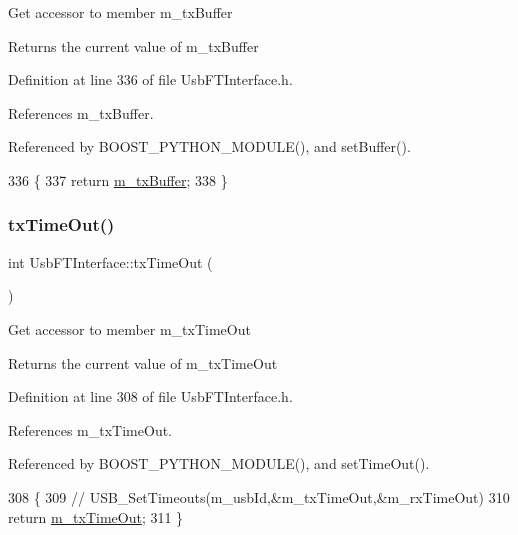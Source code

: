 Get accessor to member m\+\_\+tx\+Buffer \begin{DoxyReturn}{Returns}
the current value of m\+\_\+tx\+Buffer 
\end{DoxyReturn}


Definition at line 336 of file Usb\+F\+T\+Interface.\+h.



References m\+\_\+tx\+Buffer.



Referenced by B\+O\+O\+S\+T\+\_\+\+P\+Y\+T\+H\+O\+N\+\_\+\+M\+O\+D\+U\+L\+E(), and set\+Buffer().


\begin{DoxyCode}
336                   \{
337     \textcolor{keywordflow}{return} \hyperlink{classUsbFTInterface_a10385649160531f6976d55176bee1f2d}{m\_txBuffer};
338   \}
\end{DoxyCode}
\mbox{\label{classUsbFTInterface_acab2397cb42003a1ed8f69a0c6cae195}} 
\subsubsection{\texorpdfstring{tx\+Time\+Out()}{txTimeOut()}}
{\footnotesize\ttfamily int Usb\+F\+T\+Interface\+::tx\+Time\+Out (\begin{DoxyParamCaption}{ }\end{DoxyParamCaption})\hspace{0.3cm}{\ttfamily [inline]}}

Get accessor to member m\+\_\+tx\+Time\+Out \begin{DoxyReturn}{Returns}
the current value of m\+\_\+tx\+Time\+Out 
\end{DoxyReturn}


Definition at line 308 of file Usb\+F\+T\+Interface.\+h.



References m\+\_\+tx\+Time\+Out.



Referenced by B\+O\+O\+S\+T\+\_\+\+P\+Y\+T\+H\+O\+N\+\_\+\+M\+O\+D\+U\+L\+E(), and set\+Time\+Out().


\begin{DoxyCode}
308                    \{
309     \textcolor{comment}{//    USB\_SetTimeouts(m\_usbId,&m\_txTimeOut,&m\_rxTimeOut)}
310     \textcolor{keywordflow}{return} \hyperlink{classUsbFTInterface_af88e498a8ed759e35ae9e94f74ffcf56}{m\_txTimeOut};
311   \}  
\end{DoxyCode}
\mbox{\label{classUsbFTInterface_a6adc58a50696c9b3268e84c291901ce7}} 

